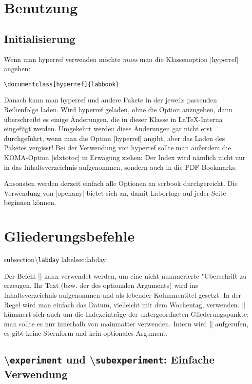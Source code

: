 \documentclass[a4paper]{article}
\begin{document}
\section{Benutzung}
\label{sec:usage}

\subsection{Initialisierung}
\label{sec:options}

Wenn man hyperref verwenden m^^f6chte \emph{muss} man die Klassenoption
|hyperref| angeben:
\begin{verbatim}
\documentclass[hyperref]{labbook}
\end{verbatim}
Danach kann man hyperref und andere Pakete in der jeweils passenden
Reihenfolge laden. Wird hyperref geladen, ohne die Option anzugeben,
dann ^^fcberschreibt es einige ^^c4nderungen, die in dieser Klasse in
\LaTeX-Interna eingef^^fcgt werden. Umgekehrt werden diese ^^c4nderungen gar
nicht erst durchgef^^fchrt, wenn man die Option |hyperref| angibt, aber
das Laden des Paketes vergisst! Bei der Verwendung von hyperref
sollte man au^^dferdem die KOMA-Option |idxtotoc| in Erw^^e4gung ziehen: Der
Index wird n^^e4mlich nicht nur in das Inhaltsverzeichnis aufgenommen,
sondern auch in die PDF-Bookmarks.

Ansonsten werden derzeit einfach alle Optionen an scrbook
durchgereicht. Die Verwendung von |openany| bietet sich an, damit
Labortage auf jeder Seite beginnen k^^f6nnen.

\section{Gliederungsbefehle}
\label{sec:gliederungsbefehle}

subsection{\textbackslash\texttt{labday}}
label{sec:labday}

\DescribeMacro{\labday} Der Befehl |\labday| kann verwendet werden, um
eine nicht nummerierte "Uberschrift zu erzeugen. Ihr Text (bzw. der des
optionalen Arguments) wird ins Inhaltsverzeichnis aufgenommen und als
lebender Kolumnentitel gesetzt.  In der Regel wird man einfach das
Datum, vielleicht mit dem Wochentag, verwenden.  |\labday| k^^fcmmert
sich auch um die Indexeintr^^e4ge der untergeordneten Gliederungspunkte;
man sollte es nur innerhalb von mainmatter verwenden. Intern wird
|\addchap| aufgerufen, es gibt keine Sternform und kein optionales
Argument.

\subsection{\textbackslash\texttt{experiment} und
  \textbackslash\texttt{subexperiment}: Einfache Verwendung}
\label{sec:exper-und-subexp}
\end{document}
